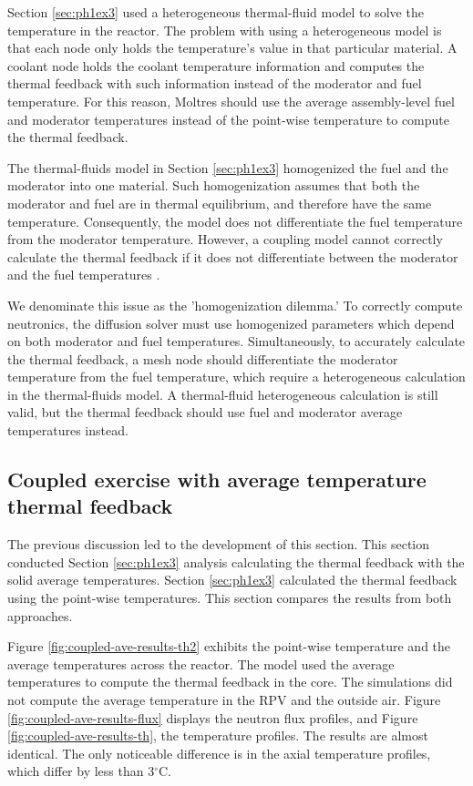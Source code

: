 Section \ref{sec:ph1ex3} used a heterogeneous thermal-fluid model to solve the temperature in the reactor.
The problem with using a heterogeneous model is that each node only holds the temperature's value in that particular material.
A coolant node holds the coolant temperature information and computes the thermal feedback with such information instead of the moderator and fuel temperature.
For this reason, Moltres should use the average assembly-level fuel and moderator temperatures instead of the point-wise temperature to compute the thermal feedback.

The thermal-fluids model in Section \ref{sec:ph1ex3} homogenized the fuel and the moderator into one material.
Such homogenization assumes that both the moderator and fuel are in thermal equilibrium, and therefore have the same temperature.
Consequently, the model does not differentiate the fuel temperature from the moderator temperature.
However, a coupling model cannot correctly calculate the thermal feedback if it does not differentiate between the moderator and the fuel temperatures \cite{damian_vhtr_2008}.

We denominate this issue as the 'homogenization dilemma.'
To correctly compute neutronics, the diffusion solver must use homogenized parameters which depend on both moderator and fuel temperatures.
Simultaneously, to accurately calculate the thermal feedback, a mesh node should differentiate the moderator temperature from the fuel temperature, which require a heterogeneous calculation in the thermal-fluids model.
A thermal-fluid heterogeneous calculation is still valid, but the thermal feedback should use fuel and moderator average temperatures instead.

\subsection{Coupled exercise with average temperature thermal feedback}
\label{sec:coupled-average}

The previous discussion led to the development of this section.
This section conducted Section \ref{sec:ph1ex3} analysis calculating the thermal feedback with the solid average temperatures.
Section \ref{sec:ph1ex3} calculated the thermal feedback using the point-wise temperatures.
This section compares the results from both approaches.

Figure \ref{fig:coupled-ave-results-th2} exhibits the point-wise temperature and the average temperatures across the reactor.
The model used the average temperatures to compute the thermal feedback in the core.
The simulations did not compute the average temperature in the RPV and the outside air.
Figure \ref{fig:coupled-ave-results-flux} displays the neutron flux profiles, and Figure \ref{fig:coupled-ave-results-th}, the temperature profiles.
The results are almost identical.
The only noticeable difference is in the axial temperature profiles, which differ by less than 3$^{\circ}$C.

